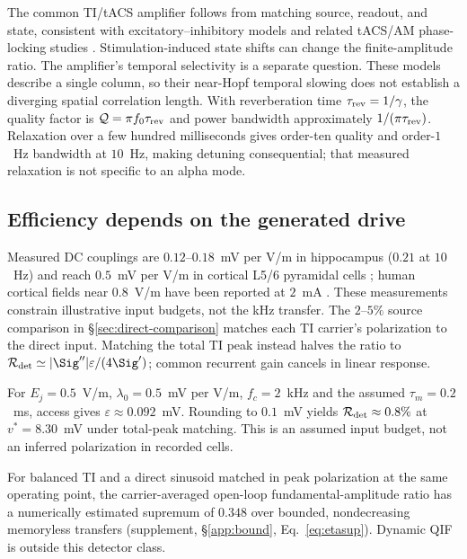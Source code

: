 The common TI/tACS amplifier follows from matching source, readout, and state, consistent with excitatory--inhibitory models \cite{ledoux2011,clusella2023} and related tACS/AM phase-locking studies \cite{ali2013,negahbani2018,krause2023}. Stimulation-induced state shifts can change the finite-amplitude ratio. The amplifier's temporal selectivity is a separate question. These models describe a single column, so their near-Hopf temporal slowing does not establish a diverging spatial correlation length. With reverberation time $\tau_{\rm rev}=1/\gamma$, the quality factor is $\mathcal Q=\pi f_0\tau_{\rm rev}$ and power bandwidth approximately $1/(\pi\tau_{\rm rev})$. Relaxation over a few hundred milliseconds \cite{wilting2018} gives order-ten quality and order-$1$~Hz bandwidth at $10$~Hz, making detuning consequential; that measured relaxation is not specific to an alpha mode.

\subsection{Efficiency depends on the generated drive}
Measured DC couplings are $0.12$--$0.18$~mV per V/m in hippocampus
($0.21$ at $10$~Hz) \cite{bikson2004,deans2007} and reach $0.5$~mV per V/m
in cortical L5/6 pyramidal cells \cite{radman2009}; human cortical fields near
$0.8$~V/m have been reported at $2$~mA \cite{huang2017,huang2017corr}.
These measurements constrain illustrative input budgets, not the kHz transfer.
The $2$--$5\%$ source comparison in \S\ref{sec:direct-comparison} matches
each TI carrier's polarization to the direct input. Matching the total TI
peak instead halves the ratio to
$\mathcal R_{\rm det}\simeq|\Sig''|\varepsilon/(4\Sig')$; common recurrent
gain cancels in linear response.

For $E_j=0.5$~V/m, $\lambda_0=0.5$~mV per V/m, $f_c=2$~kHz and the assumed
$\tau_m=0.2$~ms, access gives $\varepsilon\approx0.092$~mV. Rounding to
$0.1$~mV yields $\mathcal R_{\rm det}\approx0.8\%$ at $v^*=8.30$~mV
under total-peak matching. This is an assumed input budget, not an inferred
polarization in recorded cells.

For balanced TI and a direct sinusoid matched in peak polarization at the
same operating point, the carrier-averaged open-loop fundamental-amplitude
ratio has a numerically estimated supremum of $0.348$ over bounded,
nondecreasing memoryless transfers (supplement, \S\ref{app:bound},
Eq.~\eqref{eq:etasup}). Dynamic QIF is outside this detector class.

